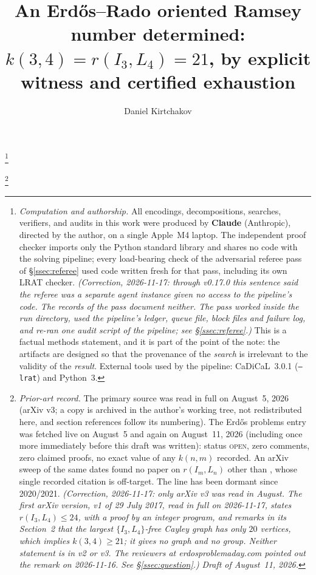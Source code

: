 \documentclass[11pt]{amsart}
\newcommand{\I}[1]{I_{#1}}
\theoremstyle{plain}
\theoremstyle{definition}
\theoremstyle{remark}
\begin{document}
\title[The oriented Ramsey number $k(3,4)=21$]{An Erd\H{o}s--Rado
oriented Ramsey number determined: $k(3,4)=r(I_3,L_4)=21$, by explicit
witness and certified exhaustion}

\author{Daniel Kirtchakov}
\address{Independent researcher (\texttt{05oz}); no institutional
affiliation. ORCID:
\href{https://orcid.org/0009-0009-5213-4098}{0009-0009-5213-4098}.}

\thanks{\emph{Computation and authorship.} All encodings, decompositions,
searches, verifiers, and audits in this work were produced by
\textbf{Claude} (Anthropic), directed by the author, on a single
Apple~M4 laptop. The independent proof checker imports only the Python
standard library and shares no code with the solving pipeline; every
load-bearing check of the adversarial referee pass of
\S\ref{ssec:referee} used code written fresh for that pass, including its
own LRAT checker. \emph{(Correction, 2026-11-17: through v0.17.0 this
sentence said the referee was a separate agent instance given no access
to the pipeline's code. The records of the pass document neither. The pass
worked inside the run directory, used the pipeline's ledger, queue file,
block files and failure log, and re-ran one audit script of the
pipeline; see \S\ref{ssec:referee}.)} This is a factual methods statement, and
it is part of the point of the note: the artifacts are designed so that
the provenance of the \emph{search} is irrelevant to the validity of the
\emph{result}. External tools used by the pipeline: CaDiCaL~3.0.1
(\texttt{--lrat}) and Python~3.}

\thanks{\emph{Prior-art record.} The primary source \cite{IRW21} was read
in full on August~5, 2026 (arXiv v3; a copy is archived in the author's
working tree, not redistributed here, and section references follow its
numbering). The Erd\H{o}s
problems entry \cite{Blo} was fetched live
on August~5 and again on August~11, 2026 (including once more immediately
before this draft was written): status \textsc{open}, zero comments, zero
claimed proofs, no exact value of any $k(n,m)$ recorded. An arXiv sweep
of the same dates found no paper on $r(I_m,L_n)$ other than \cite{IRW21},
whose single recorded citation is off-target. The line has been dormant
since 2020/2021. \emph{(Correction, 2026-11-17: only arXiv v3 was read in
August. The first arXiv version, v1 of 29 July 2017, read in full on
2026-11-17, states $r(I_3,L_4)\le 24$, with a proof by an integer
program, and remarks in its Section~2 that the largest
$\{\I3,L_4\}$-free Cayley graph has only $20$ vertices, which implies
$k(3,4)\ge 21$; it gives no graph and no group. Neither statement is in
v2 or v3. The reviewers at erdosproblemaday.com pointed out the remark on
2026-11-16. See \S\ref{ssec:question}.)} \emph{Draft of August~11, 2026.}}
\end{document}
